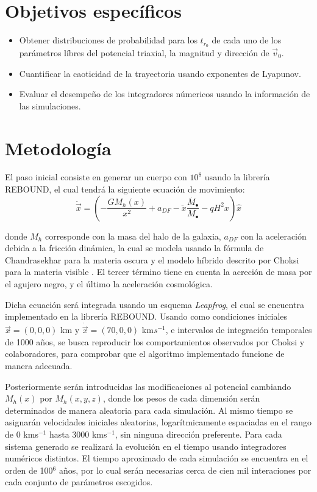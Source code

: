 \section{Objetivos específicos}
	\begin{itemize}
		\item Obtener distribuciones de probabilidad para los $t_{r_0}$ de cada uno de los par\'ametros l\'ibres del potencial triaxial, la magnitud y direcci\'on de $\vec{v}_0$.
		\item Cuantificar la caoticidad de la trayectoria usando exponentes de Lyapunov.
		\item Evaluar el desempe\~no de los integradores n\'umericos usando la informaci\'on de las simulaciones.
	\end{itemize}
	
\section{Metodología}
	El paso inicial consiste en generar un cuerpo con $10^8$ \sm usando la librer\'ia REBOUND, el cual tendr\'a la siguiente ecuaci\'on de movimiento:
	\begin{equation}
		\ddot{\vec{x}} = \left(-\dfrac{GM_h(x)}{x^2} + a_{DF}-\ddot{x}\dfrac{\dot{M_\bullet}}{M_\bullet} -qH^2x\right)\hat{x}
	\end{equation}
	
	donde $M_h$ corresponde con la masa del halo de la galaxia, $a_{DF}$ con la aceleraci\'on debida a la fricci\'on din\'amica, la cual se modela usando la f\'ormula de Chandrasekhar para la materia oscura y el modelo h\'ibrido descrito por Choksi para la materia visible \cite{choksi2017recoiling}. El tercer t\'ermino tiene en cuenta la acreci\'on de masa por el agujero negro, y el \'ultimo la aceleraci\'on cosmol\'ogica.
	
	Dicha ecuaci\'on ser\'a integrada usando un esquema \textit{Leapfrog}, el cual se encuentra implementado en la librer\'ia REBOUND. Usando como condiciones iniciales $\vec{x} = (0,0,0)$ km y $\dot{\vec{x}} = (70, 0, 0)$ km$s^{-1}$, e intervalos de integraci\'on temporales de 1000 años, se busca reproducir los comportamientos observados por Choksi y colaboradores, para comprobar que el algoritmo implementado funcione de manera adecuada.
	
	Posteriormente ser\'an introducidas las modificaciones al potencial cambiando $M_h(x)$ por $M_h(x, y, z)$, donde los pesos de cada dimensi\'on ser\'an determinados de manera aleatoria para cada simulaci\'on. Al mismo tiempo se asignar\'an velocidades iniciales aleatorias, logar\'itmicamente espaciadas en el rango de 0 kms$^{-1}$ hasta 3000 kms$^{-1}$, sin ninguna direcci\'on preferente. Para cada sistema generado se realizar\'a la evoluci\'on en el tiempo usando integradores num\'ericos distintos. El tiempo aproximado de cada simulaci\'on se encuentra en el orden de 100$^6$ a\~nos, por lo cual ser\'an necesarias cerca de cien mil interaciones por cada conjunto de par\'ametros escogidos.
	
